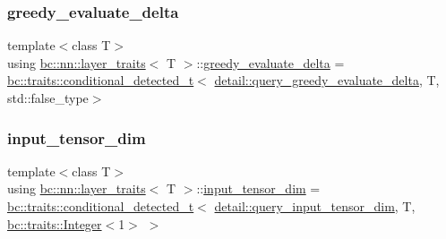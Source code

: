 \subsubsection{\texorpdfstring{greedy\+\_\+evaluate\+\_\+delta}{greedy\_evaluate\_delta}}
{\footnotesize\ttfamily template$<$class T$>$ \\
using \hyperlink{structbc_1_1nn_1_1layer__traits}{bc\+::nn\+::layer\+\_\+traits}$<$ T $>$\+::\hyperlink{structbc_1_1nn_1_1layer__traits_a07a975e03a39e8b1c9040f970e5efe1c}{greedy\+\_\+evaluate\+\_\+delta} =  \hyperlink{namespacebc_1_1traits_a1a6d378947ec32acd457890854bcd592}{bc\+::traits\+::conditional\+\_\+detected\+\_\+t}$<$ \hyperlink{namespacebc_1_1nn_1_1detail_aee17a95f5bdf1a2903f755a7de7ac632}{detail\+::query\+\_\+greedy\+\_\+evaluate\+\_\+delta}, T, std\+::false\+\_\+type$>$}

\mbox{\label{structbc_1_1nn_1_1layer__traits_ad59c13867670e4e117d657881bc2afe8}} 
\subsubsection{\texorpdfstring{input\+\_\+tensor\+\_\+dim}{input\_tensor\_dim}}
{\footnotesize\ttfamily template$<$class T$>$ \\
using \hyperlink{structbc_1_1nn_1_1layer__traits}{bc\+::nn\+::layer\+\_\+traits}$<$ T $>$\+::\hyperlink{structbc_1_1nn_1_1layer__traits_ad59c13867670e4e117d657881bc2afe8}{input\+\_\+tensor\+\_\+dim} =  \hyperlink{namespacebc_1_1traits_a1a6d378947ec32acd457890854bcd592}{bc\+::traits\+::conditional\+\_\+detected\+\_\+t}$<$ \hyperlink{namespacebc_1_1nn_1_1detail_a4bdf240452d0d96d1f433e7f0f5dd3e7}{detail\+::query\+\_\+input\+\_\+tensor\+\_\+dim}, T, \hyperlink{structbc_1_1traits_1_1Integer}{bc\+::traits\+::\+Integer}$<$1$>$ $>$}

\mbox{\label{structbc_1_1nn_1_1layer__traits_adee5a74fd6b7ae72f1bcfb483f2e3fd4}} 
